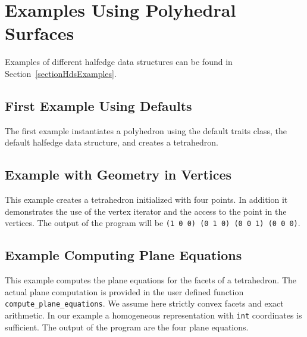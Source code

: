 \newpage
\section{Examples Using Polyhedral Surfaces}
\label{sectionPolyExamples}

Examples of different halfedge data structures can be found in
Section~\ref{sectionHdsExamples}.


\subsection{First Example Using Defaults}

The first example instantiates a polyhedron using the default traits
class, the default halfedge data structure, and creates a tetrahedron.


\subsection{Example with Geometry in Vertices}

This example creates a tetrahedron initialized with four points. In
addition it demonstrates the use of the vertex iterator and the access
to the point in the vertices. The output of
the program will be {\tt (1 0 0) (0 1 0) (0 0 1) (0 0 0)}.


\subsection{Example Computing Plane Equations}

This example computes the plane equations for the facets of a tetrahedron.
The actual plane computation is provided in the user defined function
{\tt compute\_plane\_equations}. We assume
here strictly convex facets and exact arithmetic. In our example a
homogeneous representation with {\tt int} coordinates is sufficient.
The output of the program are the four plane equations.



